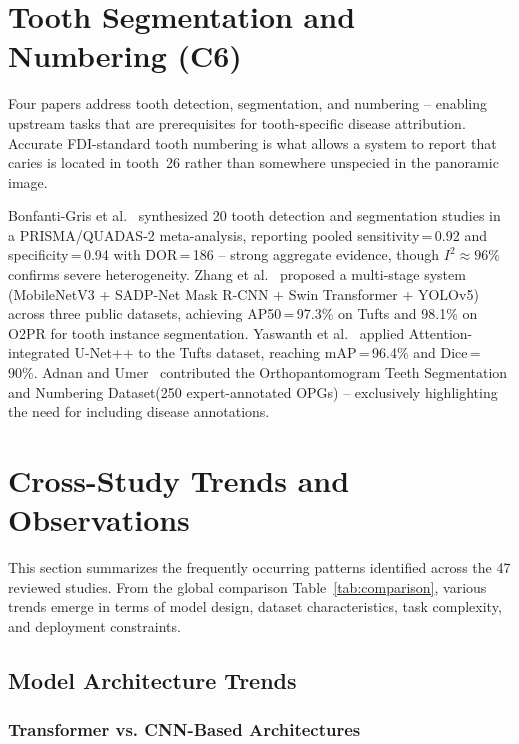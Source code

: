 \documentclass[conference]{IEEEtran}
\begin{document}
\section{Tooth Segmentation and Numbering (C6)}
\label{sec:segmentation}

Four papers address tooth detection, segmentation, and numbering --
enabling upstream tasks that are prerequisites for tooth-specific disease
attribution. Accurate FDI-standard tooth numbering is  what allows a system to report that caries is located in tooth~26 rather than somewhere unspecied in the panoramic image.

Bonfanti-Gris et al.~\cite{bonfanti2025deep} synthesized 20 tooth
detection and segmentation studies in a PRISMA/QUADAS-2 meta-analysis,
reporting pooled sensitivity\,=\,0.92 and specificity\,=\,0.94 with
DOR\,=\,186 -- strong aggregate evidence, though $I^2 \approx 96\%$
confirms severe heterogeneity. Zhang et al.~\cite{zhang2025reliable}
proposed a multi-stage system (MobileNetV3 + SADP-Net Mask R-CNN + Swin
Transformer + YOLOv5) across three public datasets, achieving
AP50\,=\,97.3\% on Tufts and 98.1\% on O2PR for tooth instance
segmentation. Yaswanth et al.~\cite{yaswanth2025automated} applied
Attention-integrated U-Net++ to the Tufts dataset, reaching
mAP\,=\,96.4\% and Dice\,=\,90\%. Adnan and
Umer~\cite{adnan2024orthopantomogram} contributed the Orthopantomogram
Teeth Segmentation and Numbering Dataset(250 expert-annotated OPGs) -- exclusively highlighting the need for including disease annotations.

\section{Cross-Study Trends and Observations}

This section summarizes the frequently occurring patterns identified across the 47 reviewed studies. From the global comparison Table~\ref{tab:comparison}, various trends emerge in terms of model design, dataset characteristics, task complexity, and deployment constraints.

\subsection{Model Architecture Trends}

\subsubsection{Transformer vs. CNN-Based Architectures}
\end{document}
